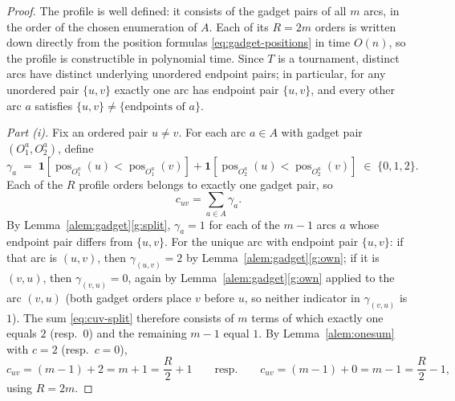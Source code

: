 \documentclass[11pt]{article}
\newcommand{\ind}{\mathbf{1}}
\newcommand{\pos}{\operatorname{pos}}
\begin{document}
\begin{proof}
The profile is well defined: it consists of the gadget pairs of all $m$ arcs, in the order of the chosen enumeration of $A$.  Each of its $R=2m$ orders is written down directly from the position formulas \eqref{eq:gadget-positions} in time $O(n)$, so the profile is constructible in polynomial time.  Since $T$ is a tournament, distinct arcs have distinct underlying unordered endpoint pairs; in particular, for any unordered pair $\{u,v\}$ exactly one arc has endpoint pair $\{u,v\}$, and every other arc $a$ satisfies $\{u,v\}\ne\{\text{endpoints of }a\}$.

\emph{Part (i).}  Fix an ordered pair $u\ne v$.  For each arc $a\in A$ with gadget pair $(O_1^a,O_2^a)$, define
\begin{equation}
  \gamma_a \;=\; \ind[\pos_{O_1^a}(u)<\pos_{O_1^a}(v)]+\ind[\pos_{O_2^a}(u)<\pos_{O_2^a}(v)]\;\in\;\{0,1,2\}.
\end{equation}
Each of the $R$ profile orders belongs to exactly one gadget pair, so
\begin{equation}\label{eq:cuv-split}
  c_{uv}=\sum_{a\in A}\gamma_a .
\end{equation}
By Lemma~\ref{alem:gadget}\ref{g:split}, $\gamma_a=1$ for each of the $m-1$ arcs $a$ whose endpoint pair differs from $\{u,v\}$.  For the unique arc with endpoint pair $\{u,v\}$: if that arc is $(u,v)$, then $\gamma_{(u,v)}=2$ by Lemma~\ref{alem:gadget}\ref{g:own}; if it is $(v,u)$, then $\gamma_{(v,u)}=0$, again by Lemma~\ref{alem:gadget}\ref{g:own} applied to the arc $(v,u)$ (both gadget orders place $v$ before $u$, so neither indicator in $\gamma_{(v,u)}$ is $1$).  The sum \eqref{eq:cuv-split} therefore consists of $m$ terms of which exactly one equals $2$ (resp.\ $0$) and the remaining $m-1$ equal $1$.  By Lemma~\ref{alem:onesum} with $c=2$ (resp.\ $c=0$),
\begin{equation}
  c_{uv}=(m-1)+2=m+1=\frac R2+1
  \qquad\text{resp.}\qquad
  c_{uv}=(m-1)+0=m-1=\frac R2-1,
\end{equation}
using $R=2m$.


\end{proof}
\end{document}
